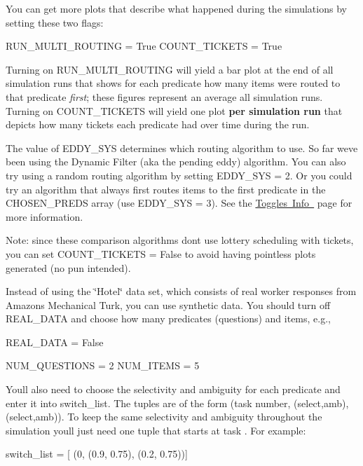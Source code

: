 \begin{DoxyVerb}
\begin{DoxyVerb}
\begin{DoxyItemize}
\item You can get more plots that describe what happened during the simulations by setting these two flags\+: \begin{DoxyVerb}RUN_MULTI_ROUTING = True
COUNT_TICKETS = True
\end{DoxyVerb}


Turning on {\ttfamily R\+U\+N\+\_\+\+M\+U\+L\+T\+I\+\_\+\+R\+O\+U\+T\+I\+NG} will yield a bar plot at the end of all simulation runs that shows for each predicate how many items were routed to that predicate {\itshape first}; these figures represent an average all simulation runs. Turning on {\ttfamily C\+O\+U\+N\+T\+\_\+\+T\+I\+C\+K\+E\+TS} will yield one plot {\bfseries{per simulation run}} that depicts how many tickets each predicate had over time during the run.
\item The value of {\ttfamily E\+D\+D\+Y\+\_\+\+S\+YS} determines which routing algorithm to use. So far we\textquotesingle{}ve been using the Dynamic Filter (aka the pending eddy) algorithm. You can also try using a random routing algorithm by setting {\ttfamily E\+D\+D\+Y\+\_\+\+S\+YS = 2}. Or you could try an algorithm that always first routes items to the first predicate in the C\+H\+O\+S\+E\+N\+\_\+\+P\+R\+E\+DS array (use {\ttfamily E\+D\+D\+Y\+\_\+\+S\+YS = 3}). See the \mbox{\hyperlink{toggles}{Toggles Info }} page for more information.

Note\+: since these comparison algorithms don\textquotesingle{}t use lottery scheduling with tickets, you can set {\ttfamily C\+O\+U\+N\+T\+\_\+\+T\+I\+C\+K\+E\+TS = False} to avoid having pointless plots generated (no pun intended).
\item Instead of using the \char`\"{}\+Hotel\char`\"{} data set, which consists of real worker responses from Amazon\textquotesingle{}s Mechanical Turk, you can use synthetic data. You should turn off {\ttfamily R\+E\+A\+L\+\_\+\+D\+A\+TA} and choose how many predicates (questions) and items, e.\+g., \begin{DoxyVerb}REAL_DATA = False

NUM_QUESTIONS = 2
NUM_ITEMS = 5
\end{DoxyVerb}


You\textquotesingle{}ll also need to choose the selectivity and ambiguity for each predicate and enter it into {\ttfamily switch\+\_\+list}. The tuples are of the form {\ttfamily (task number, (select,amb), (select,amb))}. To keep the same selectivity and ambiguity throughout the simulation you\textquotesingle{}ll just need one tuple that starts at task {}. For example\+: \begin{DoxyVerb}switch_list = [ (0, (0.9, 0.75), (0.2, 0.75))]
\end{DoxyVerb}


\end{DoxyItemize}
\end{DoxyVerb}
\end{DoxyVerb}

